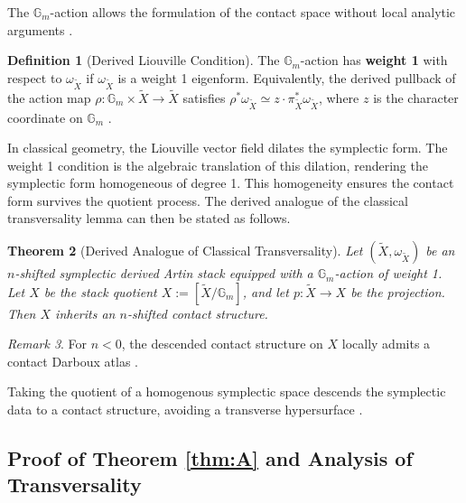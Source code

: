 \documentclass[reqno]{amsart}
\newtheorem{theorem}{Theorem}[section]
\theoremstyle{definition}
\newtheorem{definition}[theorem]{Definition}
\theoremstyle{remark}
\newtheorem{remark}[theorem]{Remark}
\newcommand{\Gm}{\mathbb{G}_m}
\begin{document}
{The $\Gm$-action allows the formulation of the contact space
without local analytic arguments \cite[Section 4.2]{Berktav1}.

\begin{definition}[Derived Liouville Condition]
  The $\Gm$-action has \textbf{weight 1} with respect to
  $\omega_{\widetilde{X}}$ if $\omega_{\widetilde{X}}$ is a weight 1 eigenform.
  Equivalently, the derived pullback of the action map
  $\rho: \Gm \times \widetilde{X} \to \widetilde{X}$ satisfies $\rho^*
  \omega_{\widetilde{X}} \simeq z \cdot \pi_{\widetilde{X}}^*
  \omega_{\widetilde{X}}$,
  where $z$ is the character coordinate on $\Gm$
  \cite[Section 2.1.1]{Calaque}.
\end{definition}
 

In classical geometry, the Liouville vector field dilates the
symplectic form. The weight 1 condition is the algebraic
translation of this dilation, rendering the symplectic form
homogeneous of degree 1. This homogeneity ensures the contact form
survives the quotient process.
The derived analogue of the classical transversality lemma can then be stated as follows.

\begin{theorem}[Derived Analogue of Classical Transversality] \label{thm:derived transversality}
  Let $(\widetilde{X}, \omega_{\widetilde{X}})$ be an $n$-shifted symplectic
  derived Artin stack equipped with a $\Gm$-action of weight 1. Let
  $X$ be the stack quotient $X := [\widetilde{X} / \Gm]$, and let $p \colon
  \widetilde{X} \to X$ be the projection. Then $X$ inherits an
  $n$-shifted contact structure.
\end{theorem}

\begin{remark} \label{rmk:darboux_atlas}
  For $n < 0$, the descended contact structure
  on $X$ locally admits a contact Darboux atlas \cite[Theorem 3.7]{Berktav2}.
\end{remark}

Taking the quotient of a homogenous symplectic space descends the
symplectic data to a contact structure, avoiding a transverse
hypersurface \cite[Section 2.26]{Berktav2}.

\subsection{Proof of Theorem \ref{thm:A} and Analysis of Transversality}\label{sec:proof}

}
\end{document}
